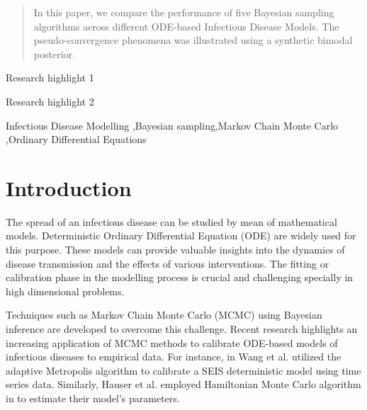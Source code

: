 \documentclass[nonatbib,preprint,12pt,authoryear]{elsarticle}
\begin{document}
\begin{frontmatter}
\begin{abstract}
 In this paper, we compare the performance of five Bayesian sampling algorithms across different ODE-based Infectious Disease Models. The pseudo-convergence phenomena was illustrated using a synthetic bimodal posterior. 
\end{abstract}


\begin{highlights}
\item Research highlight 1
\item Research highlight 2
\end{highlights}

\begin{keyword}
Infectious Disease Modelling \sep Bayesian sampling\sep Markov Chain Monte Carlo \sep Ordinary Differential Equations
\end{keyword}

\end{frontmatter}

\section{Introduction}
\label{sec:MCMC_Compar_Intro}
The spread of an infectious disease can be studied by mean of mathematical models. Deterministic Ordinary Differential Equation (ODE) are widely used for this purpose. These models can provide valuable insights into the dynamics of disease transmission and the effects of various interventions. 
The fitting or calibration phase in the modelling process is crucial and challenging specially in high dimensional problems.

Techniques such as Markov Chain Monte Carlo (MCMC) using Bayesian inference are developed to overcome this challenge. Recent research highlights an increasing application of MCMC methods to calibrate ODE-based models of infectious diseases to empirical data. For instance, in \cite{wang_data-driven_2013}Wang et al. utilized the adaptive Metropolis algorithm to calibrate a SEIS deterministic model using time series data. Similarly, Hauser et al. employed Hamiltonian Monte Carlo algorithm in \cite{hauser_counotte_margossian_konstantinoudis_low_althaus_riou_2020} to estimate their model's parameters.
\end{document}
